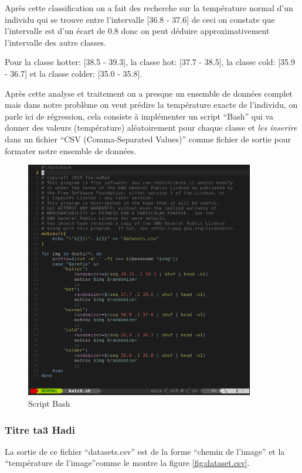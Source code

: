 \documentclass[12pt]{article}
\begin{document}
 Après cette classification on a fait des recherche sur la température normal d’un individu qui se trouve entre l’intervalle [36.8 - 37.6] de ceci on constate que l’intervalle est d’un écart de 0.8 donc on peut déduire approximativement l’intervalle des autre classes.

Pour la classe hotter: [38.5 - 39.3], la classe hot: [37.7 - 38.5], la classe cold: [35.9 - 36.7] et la classe colder: [35.0 - 35.8]. 

Après cette analyse et traitement on a presque un ensemble de données complet mais dans notre problème on veut prédire la température exacte de l’individu, on parle ici de régression, cela consiste à implémenter un script “Bash” qui va donner des valeurs (température) aléatoirement pour chaque classe et \textit{les inserire} dans un fichier “CSV (Comma-Separated Values)” comme fichier de sortie pour formater notre ensemble de données.

\begin{figure}[h]
	\centering
	\includegraphics[width=10cm]{img-Chapiter-4/batch.png}
	\caption{Script Bash}
\end{figure}

\subsubsection*{Titre ta3 Hadi}
La sortie de ce fichier “datasets.csv” est de la forme “chemin de l’image” et la “température de l’image”comme le montre la figure  \ref{fig:dataset.csv}.
\end{document}

